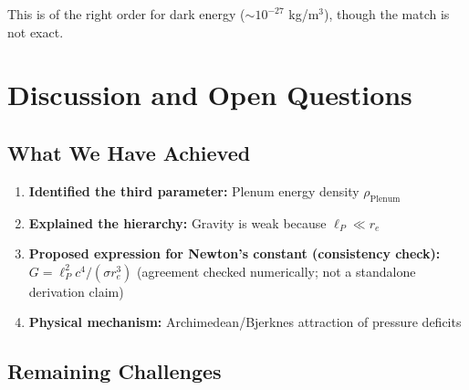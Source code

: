 This is of the right order for dark energy ($\sim 10^{-27}$ kg/m$^3$), though the match is not exact.

\newpage

\section{Discussion and Open Questions}
\label{sec:grav_discussion}

\subsection{What We Have Achieved}

\begin{enumerate}
    \item \textbf{Identified the third parameter:} Plenum energy density $\rho_{\text{Plenum}}$
    
    \item \textbf{Explained the hierarchy:} Gravity is weak because $\ell_P \ll r_e$
    
    \item \textbf{Proposed expression for Newton's constant (consistency check):} $G = \ell_P^2 c^4 / (\sigma r_e^3)$  (agreement checked numerically; not a standalone derivation claim)
    
    \item \textbf{Physical mechanism:} Archimedean/Bjerknes attraction of pressure deficits
\end{enumerate}

\subsection{Remaining Challenges}

